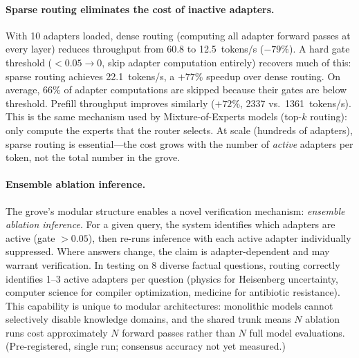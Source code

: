 \documentclass{article}
\begin{document}
\paragraph{Sparse routing eliminates the cost of inactive adapters.}
With 10 adapters loaded, dense routing (computing all adapter forward passes
at every layer) reduces throughput from 60.8 to 12.5~tokens/s ($-79\%$). A
hard gate threshold ($<0.05 \to 0$, skip adapter computation entirely)
recovers much of this: sparse routing achieves 22.1~tokens/s, a $+77\%$
speedup over dense routing. On average, 66\% of adapter computations are
skipped because their gates are below threshold. Prefill throughput improves
similarly ($+72\%$, 2337 vs.\ 1361~tokens/s). This is the same mechanism
used by Mixture-of-Experts models (top-$k$ routing): only compute the experts
that the router selects. At scale (hundreds of adapters), sparse routing is
essential---the cost grows with the number of \emph{active} adapters per
token, not the total number in the grove.

\paragraph{Ensemble ablation inference.}
The grove's modular structure enables a novel verification mechanism:
\emph{ensemble ablation inference}. For a given query, the system
identifies which adapters are active (gate $>0.05$), then re-runs
inference with each active adapter individually suppressed. Where
answers change, the claim is adapter-dependent and may warrant
verification. In testing on 8 diverse factual questions, routing
correctly identifies 1--3 active adapters per question (physics for
Heisenberg uncertainty, computer science for compiler optimization,
medicine for antibiotic resistance). This capability is unique to
modular architectures: monolithic models cannot selectively disable
knowledge domains, and the shared trunk means $N$ ablation runs cost
approximately $N$ forward passes rather than $N$ full model evaluations.
(Pre-registered, single run; consensus accuracy not yet measured.)
\end{document}
